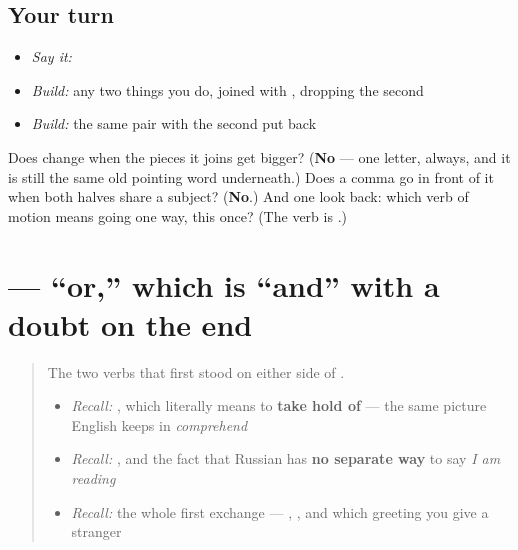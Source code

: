 \subsection*{Your turn}
\begin{itemize}
\raggedright
  \item \emph{Say it:} \emph{   }
  \item \emph{Build:} any two things you do, joined with \textbf{}, dropping the second \emph{}
  \item \emph{Build:} the same pair with the second \emph{} put back
\end{itemize}

\begin{tcolorbox}[breakable,colback=teal!4,colframe=teal!35!black,title={Before you move on}]
Does \textbf{} change when the pieces it joins get bigger? (\textbf{No} — one letter, always, and it is still the same old pointing word underneath.) Does a comma go in front of it when both halves share a subject? (\textbf{No}.) And one look back: which verb of motion means going one way, this once? (The verb is \textbf{}.)
\end{tcolorbox}
\section[\texorpdfstring{\ru{или} (íli)}{или (íli)}]{ — \textquotedblleft{}or,\textquotedblright{} which is \textquotedblleft{}and\textquotedblright{} with a doubt on the end}

\label{lesson:RU-C16-ili}



\begin{quote}
The two verbs that first stood on either side of \textbf{}.

\begin{itemize}
\raggedright
  \item \emph{Recall:} \emph{}, which literally means to \textbf{take hold of} — the same picture English keeps in \emph{comprehend}
  \item \emph{Recall:} \emph{}, and the fact that Russian has \textbf{no separate way} to say \emph{I am reading}
  \item \emph{Recall:} the whole first exchange — \emph{}, \emph{}, and which greeting you give a stranger
\end{itemize}
\end{quote}

